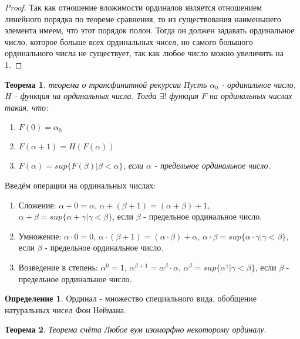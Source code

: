 \documentclass[a4paper, 12pt]{article}
\theoremstyle{definition}
\newtheorem*{definition}{Определение}
\theoremstyle{plain}
\newtheorem*{theorem}{Теорема}
\theoremstyle{remark}
\begin{document}
  \begin{proof}
    Так как отношение вложимости ординалов является отношением линейного порядка по теореме сравнения, то из существования наименьшего элемента имеем, что этот порядок полон. Тогда он должен задавать ординальное число, которое больше всех ординальных чисел, но самого большого ординального числа не существует, так как любое число можно увеличить на 1.
  \end{proof}
  \begin{theorem}{теорема о трансфинитной рекурсии}
    Пусть $\alpha_0$ - ординальное число, $H$ - функция на ординальных числа. Тогда $\exists!$ функция $F$ на ординальных числах такая, что:
    \begin{enumerate}
      \item $F(0)=\alpha_0$
      \item $F(\alpha+1)=H(F(\alpha))$
      \item $F(\alpha)=sup\{F(\beta)|\beta<\alpha\}$, если $\alpha$ - предельное ординальное число.
    \end{enumerate}
  \end{theorem}
  Введём операции на ординальных числах:
  \begin{enumerate}
    \item Сложение: $\alpha+0=\alpha$, $\alpha+(\beta+1)=(\alpha+\beta)+1$, $\alpha+\beta=sup\{\alpha+\gamma|\gamma<\beta\}$, если $\beta$ - предельное ординальное число.
    \item Умножение: $\alpha\cdot0=0$, $\alpha\cdot(\beta+1)=(\alpha\cdot\beta)+\alpha$, $\alpha\cdot\beta=sup\{\alpha\cdot\gamma|\gamma<\beta\}$, если $\beta$ - предельное ординальное число.
    \item Возведение в степень: $\alpha^0=1$, $\alpha^{\beta+1}=\alpha^{\beta}\cdot\alpha$, $\alpha^{\beta}=sup\{\alpha^{\gamma}|\gamma<\beta\}$, если $\beta$ - предельное ординальное число.
  \end{enumerate}
  \begin{definition}
    Ординал - множество специального вида, обобщение натуральных чисел Фон Неймана.
  \end{definition}
  \begin{theorem}{Теорема счёта}
    Любое вум изоморфно некоторому ординалу.
  \end{theorem}
\end{document}
